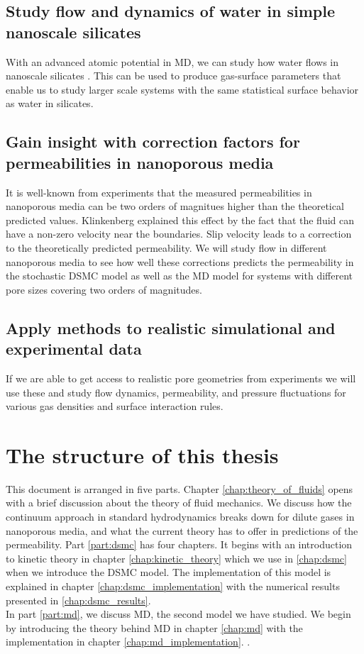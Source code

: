\subsection{Study flow and dynamics of water in simple nanoscale silicates}
With an advanced atomic potential in MD, we can study how water flows in nanoscale silicates \cite{vashishta1990interaction}. This can be used to produce gas-surface parameters that enable us to study larger scale systems with the same statistical surface behavior as water in silicates. 

\subsection{Gain insight with correction factors for permeabilities in nanoporous media}
It is well-known from experiments that the measured permeabilities in nanoporous media can be two orders of magnitues higher than the theoretical predicted values. Klinkenberg explained this effect by the fact that the fluid can have a non-zero velocity near the boundaries\cite{klinkenberg1941permeability}. Slip velocity leads to a correction to the theoretically predicted permeability. We will study flow in different nanoporous media to see how well these corrections predicts the permeability in the stochastic DSMC model as well as the MD model for systems with different pore sizes covering two orders of magnitudes.

\subsection{Apply methods to realistic simulational and experimental data}
If we are able to get access to realistic pore geometries from experiments we will use these and study flow dynamics, permeability, and pressure fluctuations for various gas densities and surface interaction rules.

\renewcommand{\thesubsection}{\thesection.\arabic{subsection}}


\section{The structure of this thesis}
This document is arranged in five parts. Chapter \ref{chap:theory_of_fluids} opens with a brief discussion about the theory of fluid mechanics. We discuss how the continuum approach in standard hydrodynamics breaks down for dilute gases in nanoporous media, and what the current theory has to offer in predictions of the permeability. Part \ref{part:dsmc} has four chapters. It begins with an introduction to kinetic theory in chapter \ref{chap:kinetic_theory} which we use in \ref{chap:dsmc} when we introduce the DSMC model. The implementation of this model is explained in chapter \ref{chap:dsmc_implementation} with the numerical results presented in \ref{chap:dsmc_results}.\\
In part \ref{part:md}, we discuss MD, the second model we have studied. We begin by introducing the theory behind MD in chapter \ref{chap:md} with the implementation in chapter \ref{chap:md_implementation}. .

